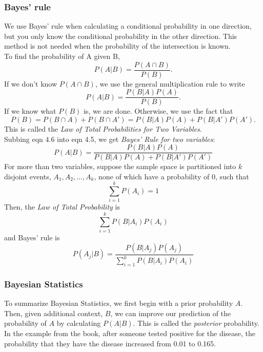\subsubsection{Bayes' rule}  %
We use Bayes' rule when calculating a conditional probability in one direction, but you only know the conditional probability in the other direction. This method is not needed when the probability of the intersection is known. \\
To find the probability of A given B,
\begin{equation}
    P(A\vert B)=\frac{P(A\cap B)}{P(B)}.
\end{equation}
If we don't know $P(A\cap B)$, we use the general multiplication rule to write
\begin{equation}
    P(A\vert B)=\frac{P(B\vert A)P(A)}{P(B)}.
\end{equation}
If we know what $P(B)$ is, we are done. Otherwise, we use the fact that
\begin{equation}
    P(B)=P(B\cap A)+P(B\cap A')=P(B\vert A)P(A) + P(B\vert A')P(A').
\end{equation}
This is called the \emph{Law of Total Probabilities for Two Variables}. \\
Subbing eqn 4.6 into eqn 4.5, we get \emph{Bayes' Rule for two variables}:
\begin{equation}
    P(A\vert B)=\frac{P(B\vert A)P(A)}{P(B\vert A)P(A)+P(B\vert A')P(A')}
\end{equation}
For more than two variables, suppose the sample space is partitioned into $k$ disjoint events, $A_1, A_2,\ldots,A_k$, none of which have a probability of 0, such that
\begin{equation}
    \sum^k_{i=1}P(A_i)=1
\end{equation}
Then, the \emph{Law of Total Probability} is
\begin{equation}
    \sum^k_{i=1}P(B\vert A_i)P(A_i)
\end{equation}
and Bayes' rule is
\begin{equation}
    P(A_j\vert B)=\frac{P(B\vert A_j)P(A_j)}{\sum^k_{i=1}P(B\vert A_i)P(A_i)}
\end{equation}
\subsubsection{Bayesian Statistics}  %
To summarize Bayesian Statistics, we first begin with a prior probability $A$. Then, given additional context, $B$, we can improve our prediction of the probability of $A$ by calculating $P(A\vert B)$. This is called the \emph{posterior} probability. In the example from the book, after someone tested positive for the disease, the probability that they have the disease increased from 0.01 to 0.165.
